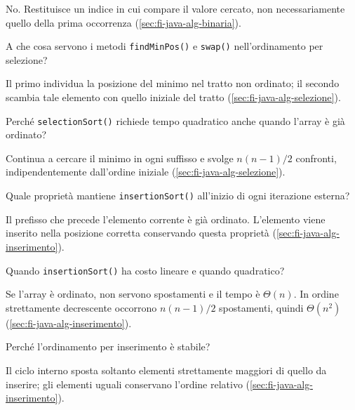 No. Restituisce un indice in cui compare il valore cercato,
non necessariamente quello della prima occorrenza
(\cref{sec:fi-java-alg-binaria}).

\begin{exercise}
\label{ex:fi-esercizi-java-alg-selezione-supporto}
A che cosa servono i metodi \texttt{findMinPos()} e \texttt{swap()}
nell'ordinamento per selezione?
\end{exercise}

Il primo individua la posizione del minimo nel tratto non
ordinato; il secondo scambia tale elemento con quello iniziale
del tratto (\cref{sec:fi-java-alg-selezione}).

\begin{exercise}
\label{ex:fi-esercizi-java-alg-selezione-confronti}
Perché \texttt{selectionSort()} richiede tempo quadratico anche
quando l'array è già ordinato?
\end{exercise}

Continua a cercare il minimo in ogni suffisso e svolge
\(n(n-1)/2\) confronti, indipendentemente dall'ordine iniziale
(\cref{sec:fi-java-alg-selezione}).

\begin{exercise}
\label{ex:fi-esercizi-java-alg-inserimento-invariante}
Quale proprietà mantiene \texttt{insertionSort()} all'inizio
di ogni iterazione esterna?
\end{exercise}

Il prefisso che precede l'elemento corrente è già ordinato.
L'elemento viene inserito nella posizione corretta conservando
questa proprietà (\cref{sec:fi-java-alg-inserimento}).

\begin{exercise}
\label{ex:fi-esercizi-java-alg-inserimento-casi}
Quando \texttt{insertionSort()} ha costo lineare e quando
quadratico?
\end{exercise}

Se l'array è ordinato, non servono spostamenti e il tempo è
\(\Theta(n)\). In ordine strettamente decrescente occorrono
\(n(n-1)/2\) spostamenti, quindi \(\Theta(n^2)\)
(\cref{sec:fi-java-alg-inserimento}).

\begin{exercise}
\label{ex:fi-esercizi-java-alg-inserimento-stabile}
Perché l'ordinamento per inserimento è stabile?
\end{exercise}

Il ciclo interno sposta soltanto elementi strettamente maggiori
di quello da inserire; gli elementi uguali conservano l'ordine
relativo (\cref{sec:fi-java-alg-inserimento}).

